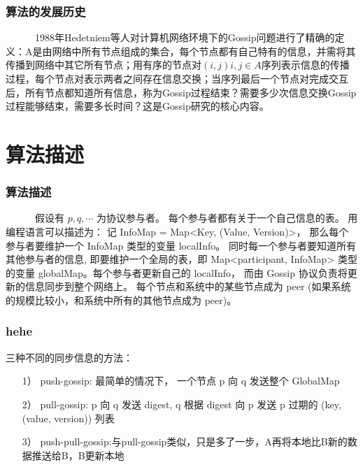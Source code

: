 \documentclass[slidestop,compress,mathserif,c]{beamer}
\begin{document}
\begin{frame}
\frametitle{算法的发展历史}
 
~~~~~~1988年Hedetniem等人对计算机网络环境下的Gossip问题进行了精确的定义：A是由网络中所有节点组成的集合，每个节点都有自己特有的信息，并需将其传播到网络中其它所有节点；用有序的节点对$(i,j)i,j\in A$序列表示信息的传播过程，每个节点对表示两者之间存在信息交换；当序列最后一个节点对完成交互后，所有节点都知道所有信息，称为Gossip过程结束？需要多少次信息交换Gossip过程能够结束，需要多长时间？这是Gossip研究的核心内容。
 
\end{frame}


\section{算法描述}

\begin{frame}
\frametitle{算法描述}
~~~~~~假设有 ${p, q, \cdots}$ 为协议参与者。 每个参与者都有关于一个自己信息的表。
用编程语言可以描述为： 
记 InfoMap = Map<Key, (Value, Version)>， 那么每个参与者要维护一个 InfoMap 类型的变量 localInfo。 同时每一个参与者要知道所有其他参与者的信息, 即要维护一个全局的表，即 Map<participant, InfoMap> 类型的变量 globalMap。每个参与者更新自己的 localInfo， 而由 Gossip 协议负责将更新的信息同步到整个网络上。
每个节点和系统中的某些节点成为 peer (如果系统的规模比较小，和系统中所有的其他节点成为 peer)。 
\end{frame}


\begin{frame}
\frametitle{hehe}
 三种不同的同步信息的方法：
 \begin{itemize}
\item[1）]push-gossip: 最简单的情况下， 一个节点 p 向 q 发送整个 GlobalMap
\item[2）]pull-gossip: p 向 q 发送 digest, q 根据 digest 向 p 发送 p 过期的 (key, (value, version)) 列表
\item[3）]push-pull-gossip:与pull-gossip类似，只是多了一步，A再将本地比B新的数据推送给B，B更新本地 
 \end{itemize}
\end{frame}
\end{document}
